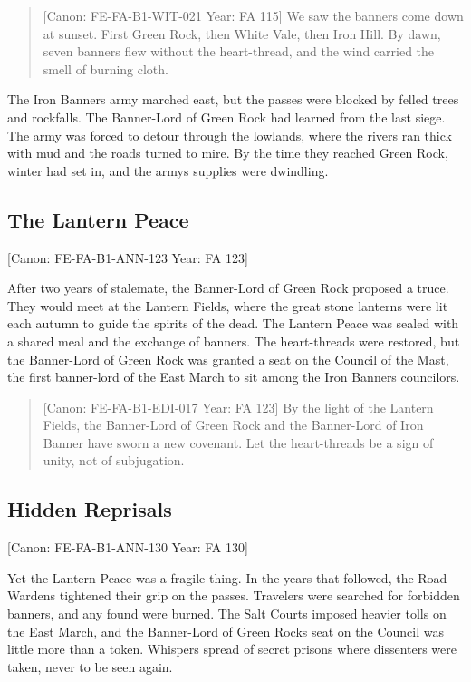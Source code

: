 \begin{quote}
{[}Canon: FE-FA-B1-WIT-021 \textbar{} Year: FA 115{]} We saw the banners
come down at sunset. First Green Rock, then White Vale, then Iron Hill.
By dawn, seven banners flew without the heart-thread, and the wind
carried the smell of burning cloth.
\end{quote}

The Iron Banner\textquotesingle s army marched east, but the passes were
blocked by felled trees and rockfalls. The Banner-Lord of Green Rock had
learned from the last siege. The army was forced to detour through the
lowlands, where the rivers ran thick with mud and the roads turned to
mire. By the time they reached Green Rock, winter had set in, and the
army\textquotesingle s supplies were dwindling.

\subsection{The Lantern Peace}\label{the-lantern-peace}

{[}Canon: FE-FA-B1-ANN-123 \textbar{} Year: FA 123{]}

After two years of stalemate, the Banner-Lord of Green Rock proposed a
truce. They would meet at the Lantern Fields, where the great stone
lanterns were lit each autumn to guide the spirits of the dead. The
Lantern Peace was sealed with a shared meal and the exchange of banners.
The heart-threads were restored, but the Banner-Lord of Green Rock was
granted a seat on the Council of the Mast, the first banner-lord of the
East March to sit among the Iron Banner\textquotesingle s councilors.

\begin{quote}
{[}Canon: FE-FA-B1-EDI-017 \textbar{} Year: FA 123{]} By the light of
the Lantern Fields, the Banner-Lord of Green Rock and the Banner-Lord of
Iron Banner have sworn a new covenant. Let the heart-threads be a sign
of unity, not of subjugation.
\end{quote}

\subsection{Hidden Reprisals}\label{hidden-reprisals}

{[}Canon: FE-FA-B1-ANN-130 \textbar{} Year: FA 130{]}

Yet the Lantern Peace was a fragile thing. In the years that followed,
the Road-Wardens tightened their grip on the passes. Travelers were
searched for forbidden banners, and any found were burned. The Salt
Courts imposed heavier tolls on the East March, and the Banner-Lord of
Green Rock\textquotesingle s seat on the Council was little more than a
token. Whispers spread of secret prisons where dissenters were taken,
never to be seen again.

